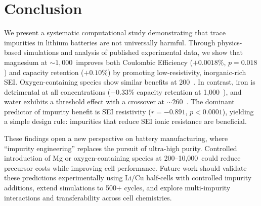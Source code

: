 \section{Conclusion}
\label{sec:conclusion}

We present a systematic computational study demonstrating that trace impurities in lithium batteries are not universally harmful. Through physics-based simulations and analysis of published experimental data, we show that magnesium at ${\sim}1{,}000$~\ppm improves both Coulombic Efficiency ($+0.0018\%$, $p=0.018$) and capacity retention ($+0.10\%$) by promoting low-resistivity, inorganic-rich SEI. Oxygen-containing species show similar benefits at 200~\ppm. In contrast, iron is detrimental at all concentrations ($-0.33\%$ capacity retention at 1{,}000~\ppm), and water exhibits a threshold effect with a crossover at ${\sim}260$~\ppm. The dominant predictor of impurity benefit is SEI resistivity ($r=-0.891$, $p<0.0001$), yielding a simple design rule: impurities that reduce SEI ionic resistance are beneficial.

These findings open a new perspective on battery manufacturing, where ``impurity engineering'' replaces the pursuit of ultra-high purity. Controlled introduction of Mg or oxygen-containing species at 200--10{,}000~\ppm could reduce precursor costs while improving cell performance. Future work should validate these predictions experimentally using Li/Cu half-cells with controlled impurity additions, extend simulations to 500+ cycles, and explore multi-impurity interactions and transferability across cell chemistries.
